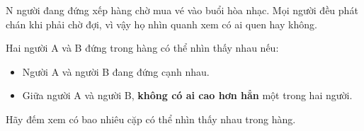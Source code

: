 N người đang đứng xếp hàng chờ mua vé vào buổi hòa nhạc. Mọi người đều phát chán khi phải chờ đợi, vì vậy họ nhìn quanh xem có ai quen hay không.  

   Hai người A và B đứng trong hàng có thể nhìn thấy nhau nếu:  
\begin{itemize}
	\item     Người A và người B đang đứng cạnh nhau.   
	\item     Giữa người A và người B,    \textbf{     không có ai cao hơn hẳn    }    một trong hai người.   
\end{itemize}

   Hãy đếm xem có bao nhiêu cặp có thể nhìn thấy nhau trong hàng.